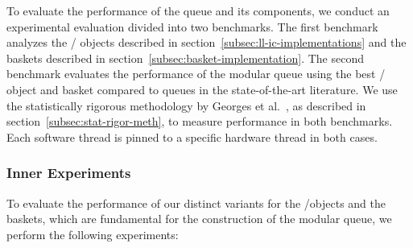 To evaluate the performance of the queue and its components, we conduct an experimental evaluation divided into two benchmarks. The first benchmark analyzes the \LL/\IC{} objects described in section~\ref{subsec:ll-ic-implementations} and the baskets described in section~\ref{subsec:basket-implementation}. The second benchmark evaluates the performance of the modular queue using the best \LL/\IC{} object and basket compared to queues in the state-of-the-art literature. We use the statistically rigorous methodology by Georges et al.~\cite{DBLP_conf_oopsla_GeorgesBE07}, as described in section~\ref{subsec:stat-rigor-meth}, to measure performance in both benchmarks. Each software thread is pinned to a specific hardware thread in both cases.

\subsubsection{\label{subsubsec:queue-experiments-inner-experiments}Inner Experiments}

To evaluate the performance of our distinct variants for the \LL/\IC objects and the baskets, which are fundamental for the construction of the modular queue, we perform the following experiments:

